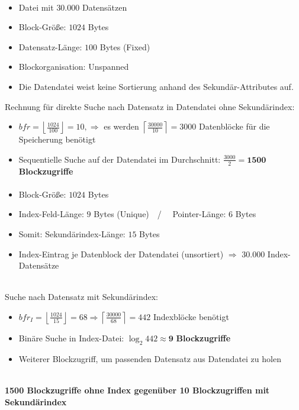 \begin{frame}{\insertsection}
\framesubtitle{\insertsubsection}
\begin{itemize}
\item Datei mit $30.000$ Datens\"atzen
\item Block-Größe: $1024$ Bytes
\item Datensatz-Länge: $100$ Bytes (Fixed)
\item Blockorganisation: Unspanned
\item Die Datendatei weist keine Sortierung anhand des Sekundär-Attributes auf.
\end{itemize}
\pause
\abs
Rechnung für direkte Suche nach Datensatz in Datendatei ohne Sekund\"arindex:
\begin{itemize}
\item $bfr=\left \lfloor\frac{1024}{100}\right\rfloor = 10, \Longrightarrow$ es werden $\left\lceil\frac{30000}{10}\right\rceil = 3000$ 
Datenbl\"ocke für die Speicherung benötigt
\item Sequentielle Suche auf der Datendatei im Durchschnitt: $\frac{3000}{2} = \mathbf{1500}$ \textbf{Blockzugriffe}
\end{itemize}
\end{frame}

\begin{frame}{\insertsection}
\framesubtitle{\insertsubsection}
\begin{itemize}
	\item Block-Größe: $1024$ Bytes
	\item Index-Feld-Länge: $9$ Bytes (Unique)$\quad$/$\quad$ Pointer-Länge: $6$ Bytes
	\item Somit: Sekund\"arindex-L\"ange: $15$ Bytes
	\item Index-Eintrag je Datenblock der Datendatei (unsortiert) $\Rightarrow$ 30.000 Index-Datens\"atze
\end{itemize}
\pause
\ \\[4pt]
Suche nach Datensatz mit Sekund\"arindex:
\begin{itemize}
	\item $bfr_I=\left \lfloor\frac{1024}{15}\right\rfloor = 68 \Rightarrow\left\lceil\frac{30000}{68}\right\rceil = 442$ 
	Indexbl\"ocke ben\"otigt
	\pause
	\item Bin\"are Suche in Index-Datei: $\log_2 442 \approx \mathbf{9}$ \textbf{Blockzugriffe}
	\item Weiterer Blockzugriff, um passenden Datensatz aus Datendatei zu holen
\end{itemize}
\pause
\ \\[4pt]
\textbf{1500 Blockzugriffe ohne Index gegen\"uber 10 Blockzugriffen mit Sekund\"arindex}
\end{frame}


